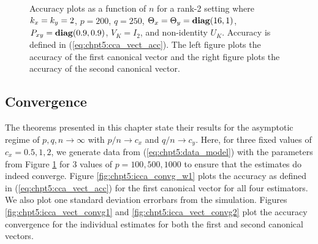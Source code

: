 \begin{figure}
  \begin{center}
    \caption{Accuracy plots as a function of $n$ for a rank-2 setting where $k_x=k_y=2$,
      $p=200$, $q=250$, $\Theta_x=\Theta_y=\mathop{\bf diag}(16,1)$, $P_{xy}=\mathop{\bf diag}(0.9,0.9)$, $V_K=I_2$, and
      non-identity $U_K$. Accuracy is defined in (\ref{eq:chpt5:cca_vect_acc}). The left
      figure plots the accuracy of the first canonical vector and the right figure plots
      the accuracy of the second canonical vector.}
    \label{fig:chpt5:non_ident_uktil}
  \end{center}
\end{figure}

\subsection{Convergence}

The theorems presented in this chapter state their results for the asymptotic regime of
$p,q,n\to\infty$ with $p/n\to c_x$ and $q/n\to c_y$. Here, for three fixed values of $c_x=0.5,
1, 2$, we generate data from (\ref{eq:chpt5:data_model}) with the parameters from Figure
\ref{fig:chpt5:non_ident_uktil} for 3 values of $p=100,500,1000$ to ensure that the estimates do
indeed converge. Figure \ref{fig:chpt5:icca_convg_w1} plots the accuracy as defined in
(\ref{eq:chpt5:cca_vect_acc}) for the first canonical vector for all four estimators. We also plot
one standard deviation errorbars from the simulation. Figures \ref{fig:chpt5:icca_vect_convg1}
and \ref{fig:chpt5:icca_vect_convg2} plot the accuracy convergence for the individual estimates
for both the first and second canonical vectors.

